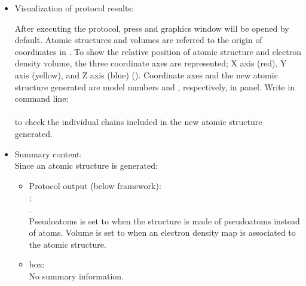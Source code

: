 \begin{itemize}
 \item Visualization of protocol results:
 
 After executing the protocol, press  and \chimera graphics window will be opened by default. Atomic structures and volumes are referred to the origin of coordinates in \chimera. To show the relative position of atomic structure and electron density volume, the three coordinate axes are represented; X axis (red), Y axis (yellow), and Z axis (blue) ().  Coordinate axes and the new atomic structure generated are model numbers  and , respectively, in \chimera {} panel. Write in \chimera command line:\\
    \\
 to check the individual chains included in the new atomic structure generated.
    
 \item Summary content:\\
 Since an atomic structure is generated:

    \begin{itemize}
     \item Protocol output (below \scipion framework):\\
      ;\\ .\\Pseudoatoms is set to  when the structure is made of pseudoatoms instead of atoms. Volume is set to  when an electron density map is associated to the atomic structure.
     \item {} box:\\No summary information.\\
    \end{itemize}
\end{itemize}

